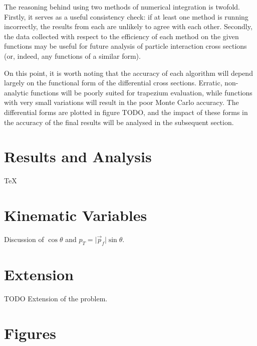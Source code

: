 \documentclass[]{article}
\begin{document}
The reasoning behind using two methods of numerical integration is twofold. Firstly, it serves as a useful consistency check: if at least one method is running incorrectly, the results from each are unlikely to agree with each other. Secondly, the data collected with respect to the efficiency of each method on the given functions may be useful for future analysis of particle interaction cross sections (or, indeed, any functions of a similar form).

On this point, it is worth noting that the accuracy of each algorithm will depend largely on the functional form of the differential cross sections. Erratic, non-analytic functions will be poorly suited for trapezium evaluation, while functions with very small variations will result in the poor Monte Carlo accuracy. The differential forms are plotted in figure TODO, and the impact of these forms in the accuracy of the final results will be analysed in the subsequent section.


\section{Results and Analysis}\label{sec:results}

\TeX


\section{Kinematic Variables}\label{sec:variables}

Discussion of $\cos{\theta}$ and $p_{T} = \lvert\vec{p}_{f}\rvert\sin{\theta}$.


\section{Extension}\label{sec:extension}

TODO Extension of the problem.


\section{Figures}
\end{document}
